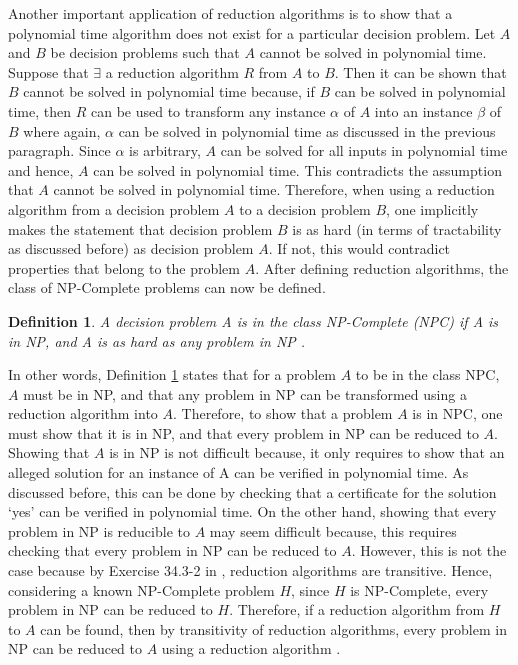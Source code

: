 \documentclass[12pt]{article}
\newtheorem{definition}{Definition}[subsection]
\numberwithin{equation}{subsection}
\numberwithin{table}{subsection}
\numberwithin{algorithm}{subsection}
\numberwithin{figure}{subsection}
\begin{document}
Another important application of reduction algorithms is to show that a polynomial time algorithm does not exist for a particular decision problem. Let $\mathit{A}$ and $\mathit{B}$ be decision problems such that $\mathit{A}$ cannot be solved in polynomial time. Suppose that $\exists$ a reduction algorithm $\mathit{R}$ from $\mathit{A}$ to $\mathit{B}$. Then it can be shown that $\mathit{B}$ cannot be solved in polynomial time because, if $\mathit{B}$ can be solved in polynomial time, then $\mathit{R}$ can be used to transform any instance $\alpha$ of $\mathit{A}$ into an instance $\beta$ of $\mathit{B}$ where again, $\alpha$ can be solved in polynomial time as discussed in the previous paragraph. Since $\alpha$ is arbitrary, $\mathit{A}$ can be solved for all inputs in polynomial time and hence, $\mathit{A}$ can be solved in polynomial time. This contradicts the assumption that $\mathit{A}$ cannot be solved in polynomial time. Therefore, when using a reduction algorithm from a decision problem $\mathit{A}$ to a decision problem $\mathit{B}$, one implicitly makes the statement that decision problem $\mathit{B}$ is as hard (in terms of tractability as discussed before) as decision problem $\mathit{A}$. If not, this would contradict properties that belong to the problem $\mathit{A}$. After defining reduction algorithms, the class of NP-Complete problems can now be defined. \cite{cormen_leiserson_rivest_stein}
\begin{definition}
\label{NPC}
A decision problem A is in the class NP-Complete (NPC) if A is in NP, and A is as hard as any problem in NP { }.
\end{definition}
In other words, Definition \ref{NPC} states that for a problem $\mathit{A}$ to be in the class NPC, $\mathit{A}$ must be in NP, and that any problem in NP can be transformed using a reduction algorithm into $\mathit{A}$. Therefore, to show that a problem $\mathit{A}$ is in NPC, one must show that it is in NP, and that every problem in NP can be reduced to $\mathit{A}$. Showing that $\mathit{A}$ is in NP is not difficult because, it only requires to show that an alleged solution for an instance of A can be verified in polynomial time. As discussed before, this can be done by checking that a certificate for the solution `yes' can be verified in polynomial time. On the other hand, showing that every problem in NP is reducible to $\mathit{A}$ may seem difficult because, this requires checking that every problem in NP can be reduced to $\mathit{A}$. However, this is not the case because by Exercise 34.3-2 in \cite{cormen_leiserson_rivest_stein}, reduction algorithms are transitive. Hence, considering a known NP-Complete problem $\mathit{H}$, since $\mathit{H}$ is NP-Complete, every problem in NP can be reduced to $\mathit{H}$. Therefore, if a reduction algorithm from $\mathit{H}$ to $\mathit{A}$ can be found, then by transitivity of reduction algorithms, every problem in NP can be reduced to $\mathit{A}$ using a reduction algorithm \cite{cormen_leiserson_rivest_stein}.\\\\
\end{document}
